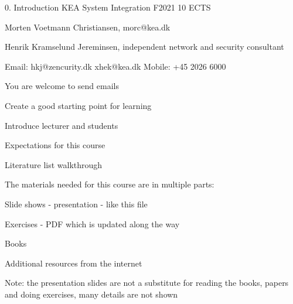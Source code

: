 \documentclass[Screen16to9,17pt]{foils}
\begin{document}
\mytitlepage
{0. Introduction}
{KEA System Integration F2021 10 ECTS}


\begin{list2}
\item Morten Voetmann Christiansen, morc@kea.dk
\item Henrik Kramselund Jereminsen, independent network and security consultant
\item Email: hkj@zencurity.dk xhek@kea.dk Mobile: +45 2026 6000
\end{list2}

You are welcome to send emails


\begin{list2}
\item Create a good starting point for learning
\item Introduce lecturer and students
\item Expectations for this course
\item Literature list walkthrough
\end{list2}



\begin{list1}
\item The materials needed for this course are in multiple parts:
\begin{list2}
\item Slide shows - presentation - like this file
\item Exercises - PDF which is updated along the way
\item Books
\item Additional resources from the internet
\end{list2}
\item Note: the presentation slides are not a substitute for reading the books, papers\\ and doing exercises, many details are not shown
\end{list1}
\end{document}
